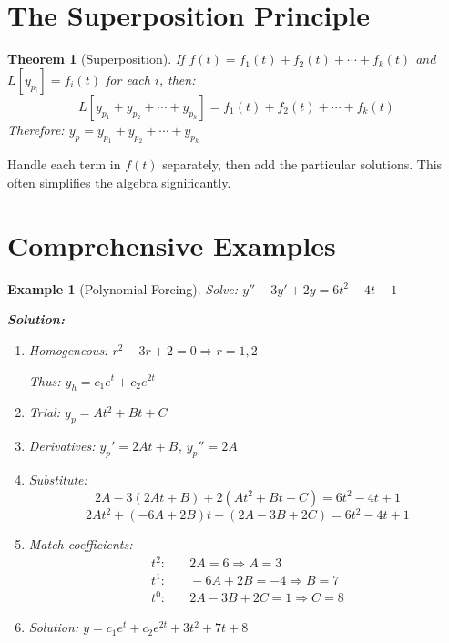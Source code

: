 \documentclass[12pt]{article}
\newtheorem{theorem}{Theorem}
\newtheorem{example}{Example}
\begin{document}
\section{The Superposition Principle}

\begin{theorem}[Superposition]
If $f(t) = f_1(t) + f_2(t) + \cdots + f_k(t)$ and $L[y_{p_i}] = f_i(t)$ for each $i$, then:
$$L[y_{p_1} + y_{p_2} + \cdots + y_{p_k}] = f_1(t) + f_2(t) + \cdots + f_k(t)$$
Therefore: $y_p = y_{p_1} + y_{p_2} + \cdots + y_{p_k}$
\end{theorem}

\begin{keypoint}
Handle each term in $f(t)$ separately, then add the particular solutions. This often simplifies the algebra significantly.
\end{keypoint}

\section{Comprehensive Examples}

\begin{example}[Polynomial Forcing]
Solve: $y'' - 3y' + 2y = 6t^2 - 4t + 1$

\textbf{Solution:}
\begin{enumerate}
    \item Homogeneous: $r^2 - 3r + 2 = 0 \Rightarrow r = 1, 2$

    Thus: $y_h = c_1 e^t + c_2 e^{2t}$

    \item Trial: $y_p = At^2 + Bt + C$

    \item Derivatives: $y_p' = 2At + B$, $y_p'' = 2A$

    \item Substitute:
    $$2A - 3(2At + B) + 2(At^2 + Bt + C) = 6t^2 - 4t + 1$$
    $$2At^2 + (-6A + 2B)t + (2A - 3B + 2C) = 6t^2 - 4t + 1$$

    \item Match coefficients:
    \begin{align}
    t^2: & \quad 2A = 6 \Rightarrow A = 3 \\
    t^1: & \quad -6A + 2B = -4 \Rightarrow B = 7 \\
    t^0: & \quad 2A - 3B + 2C = 1 \Rightarrow C = 8
    \end{align}

    \item Solution: $y = c_1 e^t + c_2 e^{2t} + 3t^2 + 7t + 8$
\end{enumerate}
\end{example}
\end{document}
